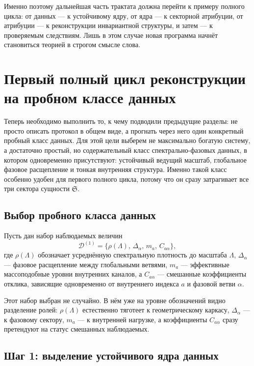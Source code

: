 \documentclass[12pt,a4paper]{article}
\begin{document}
Именно поэтому дальнейшая часть трактата должна перейти к примеру полного цикла: от данных --- к устойчивому ядру, от ядра --- к секторной атрибуции, от атрибуции --- к реконструкции инвариантной структуры, и затем --- к проверяемым следствиям. Лишь в этом случае новая программа начнёт становиться теорией в строгом смысле слова.


\section{Первый полный цикл реконструкции на пробном классе данных}

Теперь необходимо выполнить то, к чему подводили предыдущие разделы: не просто описать протокол в общем виде, а прогнать через него один конкретный пробный класс данных. Для этой цели выберем не максимально богатую систему, а достаточно простый, но содержательный класс спектрально-фазовых данных, в котором одновременно присутствуют: устойчивый ведущий масштаб, глобальное фазовое расщепление и тонкая внутренняя структура. Именно такой класс особенно удобен для первого полного цикла, потому что он сразу затрагивает все три сектора сущности \(\mathfrak{S}\).

\subsection{Выбор пробного класса данных}

Пусть дан набор наблюдаемых величин
\begin{equation}
\mathcal{D}^{(1)} = \{\rho(\Lambda),\, \Delta_{\alpha},\, m_a,\, C_{a\alpha}\},
\end{equation}
где \(\rho(\Lambda)\) обозначает усреднённую спектральную плотность до масштаба \(\Lambda\), \(\Delta_{\alpha}\) --- фазовое расщепление между глобальными ветвями, \(m_a\) --- эффективные массоподобные уровни внутренних каналов, а \(C_{a\alpha}\) --- смешанные коэффициенты отклика, зависящие одновременно от внутреннего индекса \(a\) и фазовой ветви \(\alpha\).

Этот набор выбран не случайно. В нём уже на уровне обозначений видно разделение ролей: \(\rho(\Lambda)\) естественно тяготеет к геометрическому каркасу, \(\Delta_{\alpha}\) --- к фазовому сектору, \(m_a\) --- к внутренней нагрузке, а коэффициенты \(C_{a\alpha}\) сразу претендуют на статус смешанных наблюдаемых.

\subsection{Шаг 1: выделение устойчивого ядра данных}
\end{document}
